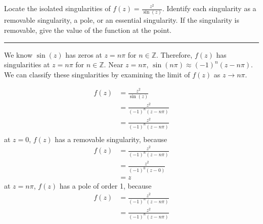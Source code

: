 \begin{example}

    Locate the isolated singularities of \( f(z) = \frac{z^2}{\sin(z)} \). Identify each singularity as a removable singularity, a pole, or an essential singularity. If the singularity is removable, give the value of the function at the point.

    \hrule
    \vspace{0.5cm}

    We know $\sin(z)$ has zeros at $z = n\pi$ for $n \in \mathbb{Z}$. Therefore, $f(z)$ has singularities at $z = n\pi$ for $n \in \mathbb{Z}$. Near $z = n\pi$, $\sin(n \pi) \approx (-1)^n(z - n\pi)$. We can classify these singularities by examining the limit of $f(z)$ as $z \to n\pi$.

    \begin{align*}
        f(z) & = \frac{z^2}{\sin(z)}          \\
             & = \frac{z^2}{(-1)^n(z - n\pi)} \\
             & = \frac{z^2}{(-1)^n(z - n\pi)} \\
    \end{align*}
    at $z = 0$, $f(z)$ has a removable singularity, because
    \begin{align*}
        f(z) & = \frac{z^2}{(-1)^n(z - n\pi)} \\
             & = \frac{z^2}{(-1)^0(z - 0)}    \\
             & = z
    \end{align*}
    at $z = n\pi$, $f(z)$ has a pole of order 1, because
    \begin{align*}
        f(z) & = \frac{z^2}{(-1)^n(z - n\pi)} \\
             & = \frac{z^2}{(-1)^n(z - n\pi)} \\
    \end{align*}
\end{example}

